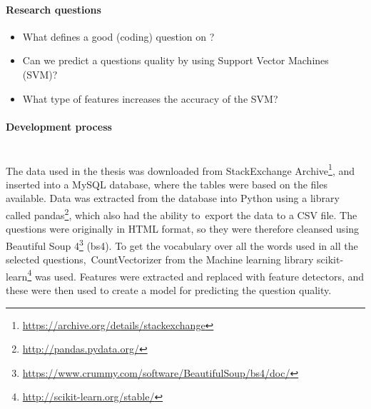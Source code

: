 \paragraph{Research questions}
\begin{itemize}
	\item What defines a good (coding) question on ?
	\item Can we predict a questions quality by using Support Vector Machines (SVM)?
	\item What type of features increases the accuracy of the SVM?
\end{itemize}

\paragraph{Development process} ~\\
The data used in the thesis was downloaded from StackExchange Archive\footnote{\url{https://archive.org/details/stackexchange}}, and inserted into a MySQL database, 
where the tables were based on the files available.
Data was extracted from the database into Python using a library called pandas\footnote{\url{http://pandas.pydata.org/}}, which also had the ability to export the data to a CSV file. 
The questions were originally in HTML format, so they were therefore cleansed using Beautiful Soup 4\footnote{
	\url{https://www.crummy.com/software/BeautifulSoup/bs4/doc/}
} (bs4). 
To get the vocabulary over all the words used in all the selected questions, CountVectorizer from the Machine learning library scikit-learn\footnote{
	\url{http://scikit-learn.org/stable/}
} was used. 
Features were extracted and replaced with feature detectors, and these were then used to create a model for predicting the question quality. 
